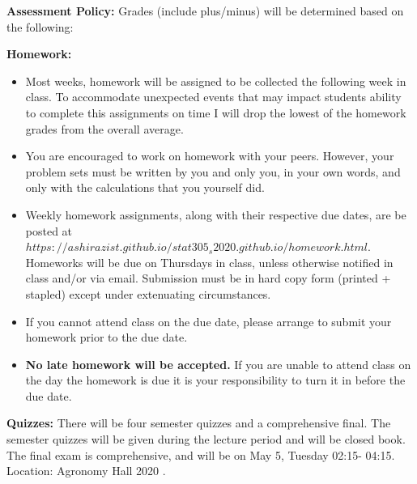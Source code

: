 \documentclass[12pt]{article}\usepackage[]{graphicx}\usepackage[]{color}
\begin{document}
\noindent\textbf{Assessment Policy:} Grades (include plus/minus) will be determined based on the following:
\begin{center} 
	\begin{minipage}{6.5in}
		\begin{flushleft}
			\textbf{Homework:} 
			\begin{itemize}
				\item 	Most weeks, homework will be assigned to be collected the following week in class. To accommodate unexpected events that may impact students ability to complete this assignments on time I will drop the lowest of the homework grades from the overall average.
				\item 	You are encouraged to work on homework with your peers. However, your problem sets must be written by you and only you, in your own words, and only with the calculations that you yourself did.
				\item Weekly homework assignments, along with their respective due dates, are be posted at \href{https://ashirazist.github.io/stat305_s2020.github.io/homework.html}{$https://ashirazist.github.io/stat305_s2020.github.io/homework.html$}. Homeworks will be due on Thursdays in class, unless otherwise notified in class and/or via email. Submission must be in hard copy form (printed + stapled) except under extenuating circumstances.
				\item  If you cannot attend class on the due date, please arrange to submit your homework prior to the due date.
				\item \textbf{No late homework will be accepted.} If you are unable to attend class on the day the homework is due it is your responsibility to turn it in before the due date.
		\end{itemize}
		\end{flushleft}
	\end{minipage}
\end{center}

\begin{center} 
	\begin{minipage}{6.5in}
		\begin{flushleft}
			\textbf{Quizzes:} 
			There will be four semester quizzes and a comprehensive final. The semester quizzes will be given during the lecture period and will be closed book. The final exam is comprehensive, and will be on May 5, Tuesday 02:15- 04:15. Location:  Agronomy Hall 2020 .
		\end{flushleft}
	\end{minipage}
\end{center}
\end{document}
